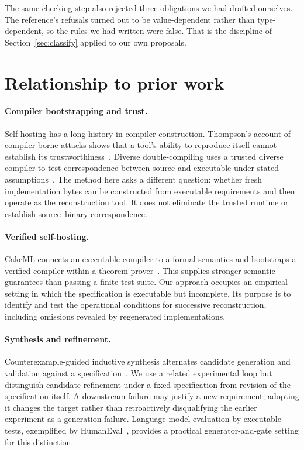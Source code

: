 \documentclass[10pt,twocolumn,letterpaper]{article}
\begin{document}
The same checking step also rejected three obligations we had drafted ourselves. The reference's refusals turned out to be value-dependent rather than type-dependent, so the rules we had written were false. That is the discipline of Section~\ref{sec:classify} applied to our own proposals.

\section{Relationship to prior work}
\paragraph{Compiler bootstrapping and trust.} Self-hosting has a long history in compiler construction. Thompson's account of compiler-borne attacks shows that a tool's ability to reproduce itself cannot establish its trustworthiness~\cite{thompson}. Diverse double-compiling uses a trusted diverse compiler to test correspondence between source and executable under stated assumptions~\cite{wheeler}. The method here asks a different question: whether fresh implementation bytes can be constructed from executable requirements and then operate as the reconstruction tool. It does not eliminate the trusted runtime or establish source--binary correspondence.

\paragraph{Verified self-hosting.} CakeML connects an executable compiler to a formal semantics and bootstraps a verified compiler within a theorem prover~\cite{cakeml}. This supplies stronger semantic guarantees than passing a finite test suite. Our approach occupies an empirical setting in which the specification is executable but incomplete. Its purpose is to identify and test the operational conditions for successive reconstruction, including omissions revealed by regenerated implementations.

\paragraph{Synthesis and refinement.} Counterexample-guided inductive synthesis alternates candidate generation and validation against a specification~\cite{solar}. We use a related experimental loop but distinguish candidate refinement under a fixed specification from revision of the specification itself. A downstream failure may justify a new requirement; adopting it changes the target rather than retroactively disqualifying the earlier experiment as a generation failure. Language-model evaluation by executable tests, exemplified by HumanEval~\cite{humaneval}, provides a practical generator-and-gate setting for this distinction.
\end{document}
